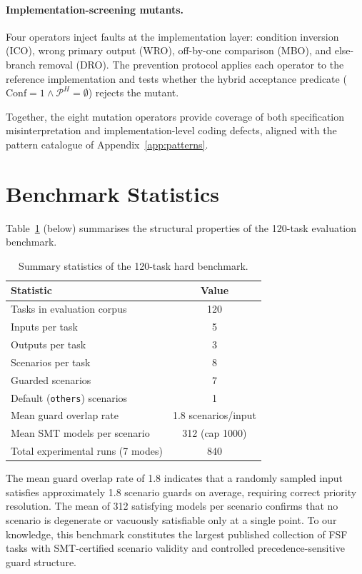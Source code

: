 \paragraph{Implementation-screening mutants.}
Four operators inject faults at the implementation layer: condition inversion
(ICO), wrong primary output (WRO), off-by-one comparison (MBO), and else-branch
removal (DRO).  The prevention protocol applies each operator to the reference
implementation and tests whether the hybrid acceptance predicate
($\mathrm{Conf} = 1 \wedge \mathcal{P}^H = \emptyset$) rejects the mutant.

Together, the eight mutation operators provide coverage of both specification
misinterpretation and implementation-level coding defects, aligned with the
pattern catalogue of Appendix~\ref{app:patterns}.

\section{Benchmark Statistics}
\label{sec:bench:stats}

Table~\ref{tab:bench:summary} (below) summarises the structural properties of the
120-task evaluation benchmark.

\begin{table}[htbp]
  \caption{Summary statistics of the 120-task hard benchmark.}
  \label{tab:bench:summary}
  \centering
  \begin{tabular}{lc}
    \toprule
    Statistic & Value \\
    \midrule
    Tasks in evaluation corpus        & 120 \\
    Inputs per task                     & 5 \\
    Outputs per task                    & 3 \\
    Scenarios per task                  & 8 \\
    Guarded scenarios                   & 7 \\
    Default (\texttt{others}) scenarios & 1 \\
    Mean guard overlap rate             & 1.8 scenarios/input \\
    Mean SMT models per scenario        & 312 (cap 1000) \\
    Total experimental runs (7 modes)   & 840 \\
    \bottomrule
  \end{tabular}
\end{table}

The mean guard overlap rate of 1.8 indicates that a randomly sampled input
satisfies approximately 1.8 scenario guards on average, requiring correct
priority resolution.  The mean of 312 satisfying models per scenario confirms
that no scenario is degenerate or vacuously satisfiable only at a single
point.  To our knowledge, this benchmark constitutes the largest published
collection of FSF tasks with SMT-certified scenario validity and controlled
precedence-sensitive guard structure.
